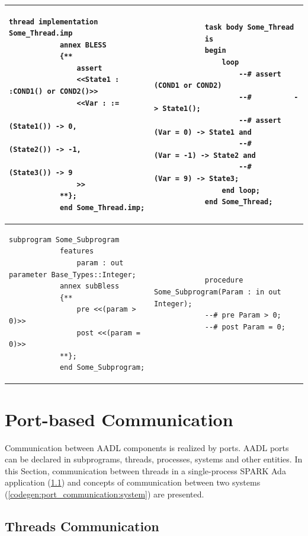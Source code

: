 \begin{center}
\begin{longtable}{| p{3in} | p{3in} |}
		\\ \hline

		\begin{lstlisting}[language=bless]
			thread implementation Some_Thread.imp
			annex BLESS 
			{**
				assert
				<<State1 : :COND1() or COND2()>>
				<<Var : :=
  								(State1()) -> 0,
  								(State2()) -> -1,
  								(State3()) -> 9
				>>
			**};
			end Some_Thread.imp;
		\end{lstlisting} 
		& 
		\begin{lstlisting}
			task body Some_Thread
			is
			begin
				loop
					--# assert (COND1 or COND2)
					--#          -> State1();
					--# assert (Var = 0) -> State1 and
					--#        (Var = -1) -> State2 and
					--#        (Var = 9) -> State3;
				end loop;
			end Some_Thread;
		\end{lstlisting} 

		\\ \hline

		\begin{lstlisting}[language=bless]
			subprogram Some_Subprogram
			features 
				param : out parameter Base_Types::Integer;
			annex subBless
			{**
				pre <<(param > 0)>>
				post <<(param = 0)>>
			**};
			end Some_Subprogram;
		\end{lstlisting} 
		& 
		\begin{lstlisting}
			procedure Some_Subprogram(Param : in out Integer);
		    --# pre Param > 0;
		    --# post Param = 0;
		\end{lstlisting} 
		
	\end{longtable}
\end{center}
\doublespacing

\clearpage

\section{Port-based Communication}
\label{codegen:port_communication}

Communication between AADL components is realized by ports. AADL ports can be declared in subprograms, threads, processes, systems and other entities. In this Section, communication between threads in a single-process SPARK Ada application (\ref{codegen:port_communication:thread}) and concepts of communication between two systems (\ref{codegen:port_communication:system}) are presented. 


\subsection{Threads Communication}
\label{codegen:port_communication:thread}

